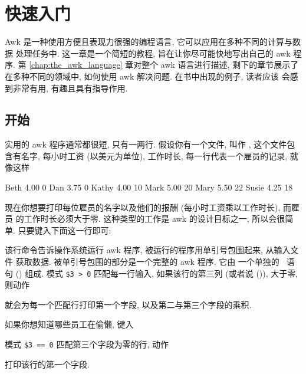
\chapter{快速入门}
\label{chap:an_awk_tutorial}

Awk 是一种使用方便且表现力很强的编程语言, 它可以应用在多种不同的计算与数据
处理任务中. 这一章是一个简短的教程, 旨在让你尽可能快地写出自己的 awk 程序.
第 \ref{chap:the_awk_language} 章对整个 awk 语言进行描述, 剩下的章节展示了
在多种不同的领域中, 如何使用 awk 解决问题. 在书中出现的例子, 读者应该
会感到非常有用, 有趣且具有指导作用.

\section{开始}
\label{sec:getting_started}

实用的 awk 程序通常都很短, 只有一两行. 假设你有一个文件, 叫作
, 这个文件包含有名字, 每小时工资 (以美元为单位),
工作时长, 每一行代表一个雇员的记录, 就像这样
\begin{file}
    Beth    4.00    0
    Dan     3.75    0
    Kathy   4.00    10
    Mark    5.00    20
    Mary    5.50    22
    Susie   4.25    18
\end{file}
现在你想要打印每位雇员的名字以及他们的报酬 (每小时工资乘以工作时长), 而雇员
的工作时长必须大于零. 这种类型的工作是 awk 的设计目标之一, 所以会很简单.
只要键入下面这一行即可:
该行命令告诉操作系统运行 awk 程序, 被运行的程序用单引号包围起来, 从输入文件
 获取数据. 被单引号包围的部分是一个完整的 awk 程序. 它由
一个单独的 \ 语句
() 组成.
模式 \verb'$3 > 0' 匹配每一行输入, 如果该行的第三列 (或者说 
()), 大于零, 则动作
就会为每一个匹配行打印第一个字段, 以及第二与第三个字段的乘积.

如果你想知道哪些员工在偷懒, 键入
模式 \verb'$3 == 0' 匹配第三个字段为零的行, 动作
打印该行的第一个字段.

